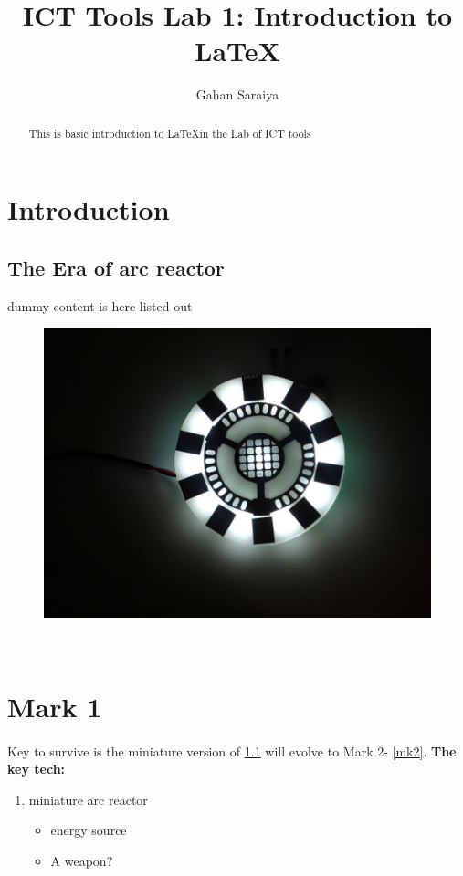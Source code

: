 \documentclass[16pt]{article}
\title{ICT Tools Lab 1: Introduction to \LaTeX}
\author{Gahan Saraiya}
\date{}
\begin{document}
\maketitle
\tableofcontents
\listoffigures

\newpage
\begin{abstract}
	This is basic introduction to \LaTeX in the Lab of ICT tools
\end{abstract}


\section{Introduction}
\label{intro}
\subsection{The Era of arc reactor}
\label{arc_reactor}
\hspace{20pt}
dummy content is here listed out \cite{ultron}
\begin{figure}[h]
	\includegraphics[scale=0.2]{arc_reactor.jpg}
\end{figure}
\\
\section{Mark 1}
\label{mk1}
\paragraph{}
Key\cite{arcReactor} to survive is the miniature version of \ref{arc_reactor} will evolve to Mark 2- \ref{mk2}.
\newline
\textbf{The key tech:}
\begin{enumerate}
	\item miniature arc reactor
	\begin{itemize}
		\item energy source
		\item A weapon?
	\end{itemize}
\end{enumerate}
\end{document}

